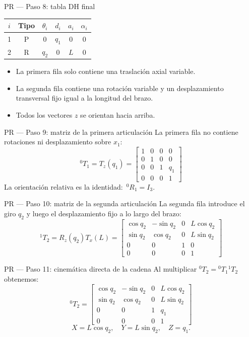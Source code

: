 \documentclass[aspectratio=169,11pt]{beamer}
\begin{document}
\begin{frame}[t]{PR — Paso 8: tabla DH final}
 \small
 \begin{tabular}{c|c|cccc}
 \toprule
 $i$ & Tipo & $\theta_i$ & $d_i$ & $a_i$ & $\alpha_i$\\\midrule
 1 & P & $0$ & $q_1$ & $0$ & $0$\\
 2 & R & $q_2$ & $0$ & $L$ & $0$\\
 \bottomrule
 \end{tabular}
 \pause
 \begin{itemize}
  \item La primera fila solo contiene una traslación axial variable.
  \item La segunda fila contiene una rotación variable y un
  desplazamiento transversal fijo igual a la longitud del brazo.
  \item Todos los vectores $z$ se orientan hacia arriba.
 \end{itemize}
\end{frame}

\begin{frame}[t]{PR — Paso 9: matriz de la primera articulación}
 \small
 La primera fila no contiene rotaciones ni desplazamiento
 sobre $x_1$:
 \[
 \boxed{{}^0T_1=T_z(q_1)=
 \begin{bmatrix}
 1&0&0&0\\
 0&1&0&0\\
 0&0&1&q_1\\
 0&0&0&1
 \end{bmatrix}}
 \]
 \pause
 \small La orientación relativa es la identidad:
 $\,{}^0R_1=I_3$.
\end{frame}

\begin{frame}[t]{PR — Paso 10: matriz de la segunda articulación}
 \small
 La segunda fila introduce el giro $q_2$ y luego
 el desplazamiento fijo a lo largo del brazo:
 \[
 \boxed{{}^1T_2=R_z(q_2)T_x(L)=
 \begin{bmatrix}
 \cos q_2&-\sin q_2&0&L\cos q_2\\
 \sin q_2&\cos q_2&0&L\sin q_2\\
 0&0&1&0\\0&0&0&1
 \end{bmatrix}}
 \]
\end{frame}

\begin{frame}[t]{PR — Paso 11: cinemática directa de la cadena}
 \small
 Al multiplicar ${}^0T_2={}^0T_1{}^1T_2$ obtenemos:
 \[
 \boxed{{}^0T_2=
 \begin{bmatrix}
 \cos q_2&-\sin q_2&0&L\cos q_2\\
 \sin q_2&\cos q_2&0&L\sin q_2\\
 0&0&1&q_1\\0&0&0&1
 \end{bmatrix}}
 \]
 \pause
 \[
 \boxed{X=L\cos q_2,\quad Y=L\sin q_2,\quad Z=q_1.}
 \]
\end{frame}
\end{document}
